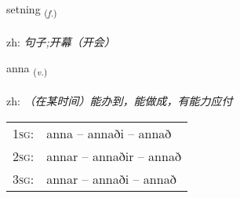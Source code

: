 \documentclass[frontgrid, backgrid]{flacards}\usepackage[]{graphicx}\usepackage[]{color}
\begin{document}
\renewcommand{\flhead}{\vskip5pt \fboxsep=0pt {\small\bfseries\footnotesize Nafnorð | 名词}}
\renewcommand{\fcfoot}{\vskip5pt \fboxsep=0pt \hspace{2pt}{\small\bfseries\footnotesize 2K}}

\renewcommand{\blhead}{\vskip5pt {\small\bfseries\footnotesize Nafnorð | 名词 }}
\renewcommand{\bcfoot}{\vskip5pt \hspace{2pt}{\small\bfseries\footnotesize 2K}}


{setning \small{\textsubscript{(\textit{f.})}} \\[1ex] %
\textphonetic{[sɛhtniŋk]} \\
zh: \emph{句子;开幕（开会）} \\  [2ex]
\renewcommand*{\arraystretch}{0.8}
}

\renewcommand{\flhead}{\vskip5pt \fboxsep=0pt {\small\bfseries\footnotesize Sagnorð | 动词}}
\renewcommand{\fcfoot}{\vskip5pt \fboxsep=0pt \hspace{2pt}{\small\bfseries\footnotesize 2K}}

\renewcommand{\blhead}{\vskip5pt {\small\bfseries\footnotesize Sagnorð | 动词 }}
\renewcommand{\bcfoot}{\vskip5pt \hspace{2pt}{\small\bfseries\footnotesize 2K}}


{anna \small{\textsubscript{(\textit{v.})}} \\[1ex] %
\textphonetic{[ana]} \\
zh: \emph{（在某时间）能办到，能做成，有能力应付} \\  [2ex]
\renewcommand*{\arraystretch}{0.8}
\begin{tabular}{p{1cm}l}
\textsc{1sg}: & anna -- annaði -- annað \\ 
\textsc{2sg}: & annar -- annaðir -- annað \\ 
\textsc{3sg}: & annar -- annaði -- annað \\ 
\end{tabular}
}
\end{document}
